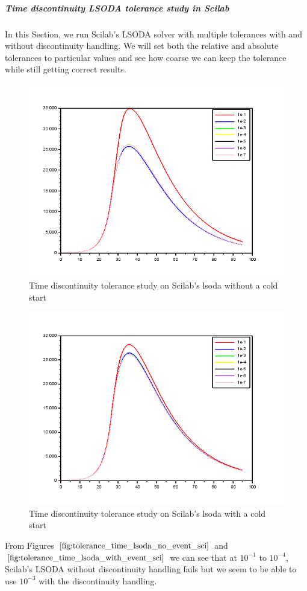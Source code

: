 \subparagraph{Time discontinuity LSODA tolerance study in Scilab}
In this Section, we run Scilab's LSODA solver with multiple tolerances with and without discontinuity handling. We will set both the relative and absolute tolerances to particular values and see how coarse we can keep the tolerance while still getting correct results.

\begin{figure}[h]
	\centering
	\includegraphics[width=0.7\linewidth]{./figures/tolerance_time_lsoda_no_event_sci}
	\caption{Time discontinuity tolerance study on Scilab's lsoda without a cold start}
	\label{fig:tolerance_time_lsoda_no_event_sci}
\end{figure}

\begin{figure}[h]
	\centering
	\includegraphics[width=0.7\linewidth]{./figures/tolerance_time_lsoda_with_event_sci}
	\caption{Time discontinuity tolerance study on Scilab's lsoda with a cold start}
	\label{fig:tolerance_time_lsoda_with_event_sci}
\end{figure}

From Figures $\ref{fig:tolerance_time_lsoda_no_event_sci}$ and $\ref{fig:tolerance_time_lsoda_with_event_sci}$ we can see that at $10^{-1}$ to $10^{-4}$, Scilab's LSODA without discontinuity handling fails but we seem to be able to use $10^{-3}$ with the discontinuity handling. 

